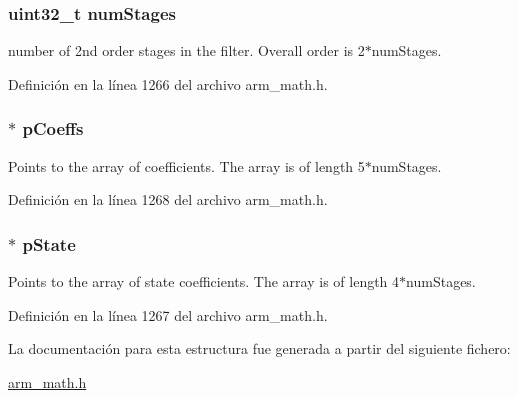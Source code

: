 \subsubsection[{\texorpdfstring{num\+Stages}{numStages}}]{\setlength{\rightskip}{0pt plus 5cm}uint32\+\_\+t num\+Stages}\hypertarget{structarm__biquad__casd__df1__inst__f32_aed9c8a6224cd149e8e12b17b25b9b767}{}\label{structarm__biquad__casd__df1__inst__f32_aed9c8a6224cd149e8e12b17b25b9b767}
number of 2nd order stages in the filter. Overall order is 2$\ast$num\+Stages. 

Definición en la línea 1266 del archivo arm\+\_\+math.\+h.

\subsubsection[{\texorpdfstring{p\+Coeffs}{pCoeffs}}]{$\ast$ p\+Coeffs}\hypertarget{structarm__biquad__casd__df1__inst__f32_aacbb8dd8eeba4b21fc2bb40076405ee3}{}\label{structarm__biquad__casd__df1__inst__f32_aacbb8dd8eeba4b21fc2bb40076405ee3}
Points to the array of coefficients. The array is of length 5$\ast$num\+Stages. 

Definición en la línea 1268 del archivo arm\+\_\+math.\+h.

\subsubsection[{\texorpdfstring{p\+State}{pState}}]{$\ast$ p\+State}\hypertarget{structarm__biquad__casd__df1__inst__f32_a335c87e6fdc4b96601d95a5de8b9c463}{}\label{structarm__biquad__casd__df1__inst__f32_a335c87e6fdc4b96601d95a5de8b9c463}
Points to the array of state coefficients. The array is of length 4$\ast$num\+Stages. 

Definición en la línea 1267 del archivo arm\+\_\+math.\+h.



La documentación para esta estructura fue generada a partir del siguiente fichero\+:\begin{DoxyCompactItemize}
\item 
\hyperlink{arm__math_8h}{arm\+\_\+math.\+h}\end{DoxyCompactItemize}
